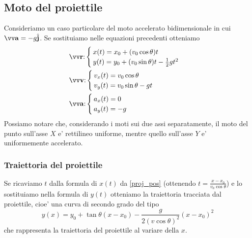 \subsection{Moto del proiettile}
Consideriamo un caso particolare del moto accelerato bidimensionale in cui $\bvv{a} = -g\bh{j}$.
Se sostituiamo nelle equazioni precedenti otteniamo
\begin{subequations}
    \begin{align}
        &\bvv{r}\text{:}
        \begin{cases}{}
            x(t) = x_0 + (v_0\cos{\theta})t\\
            y(t) = y_0 + (v_0\sin{\theta})t - \frac{1}{2}gt^2
        \end{cases} \label{proj_pos}\\
        &\bvv{v}\text{:}
        \begin{cases}{}
            v_x(t) = v_0\cos{\theta} \\
            v_y(t) = v_0\sin{\theta} - gt
        \end{cases} \\
        &\bvv{a}\text{:}
        \begin{cases}{}
            a_x(t) = 0 \\
            a_y(t) = -g
        \end{cases}
    \end{align}
\end{subequations}
Possiamo notare che, considerando i moti sui due assi separatamente, il moto del punto sull'asse $X$ e' rettilineo uniforme, 
mentre quello sull'asse $Y$ e' uniformemente accelerato.

\subsubsection{Traiettoria del proiettile}
Se ricaviamo $t$ dalla formula di $x(t)$ da \ref{proj_pos} (ottenendo $t = \frac{x-x_0}{v_0\cos{\theta}}$)
e lo sostituiamo nella formula di $y(t)$ otteniamo la traiettoria tracciata dal proiettile, 
cioe' una curva di secondo grado del tipo
\begin{equation}
    y(x) = y_0 + \tan{\theta}(x-x_0) - \frac{g}{2(v\cos{\theta})^2}(x-x_0)^2 \label{proj_traj}
\end{equation}
che rappresenta la traiettoria del proiettile al variare della $x$.

